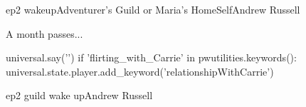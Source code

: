 \documentclass{book}
\begin{document}
\begin{node}{ep2 wakeup}{Adventurer's Guild or Maria's Home}{Self}{Andrew Russell}

    A month passes...
    \begin{code}
        universal.say('\p')
        if 'flirting_with_Carrie' in pwutilities.keywords():
            universal.state.player.add_keyword('relationshipWithCarrie')
    \end{code}



\end{node}

\begin{childnode}{ep2 guild wake up}{Andrew Russell}





\end{childnode}
\end{document}
